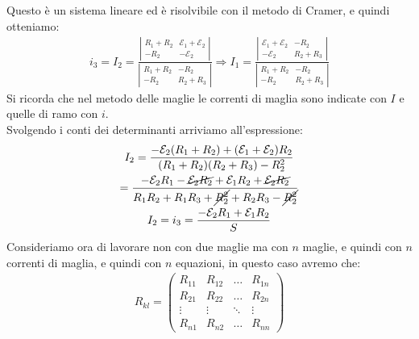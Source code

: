 \documentclass[a4paper, oneside]{article}
\begin{document}
Questo è un sistema lineare ed è risolvibile con il metodo di Cramer, e quindi otteniamo:
\begin{gather*}
    i_3 = I_2 = \frac{\left\lvert \begin{matrix}
        R_1 + R_2 & \mathcal{E}_1 + \mathcal{E}_2\\
        -R_2 & -\mathcal{E}_2
    \end{matrix} \right\rvert }{\left\lvert \begin{matrix}
        R_1 + R_2 & -R_2\\
        -R_2 & R_2 + R_3
    \end{matrix} \right\rvert }
    \Rightarrow I_1 = \frac{\left\lvert \begin{matrix}
        \mathcal{E}_1 + \mathcal{E}_2 & -R_2\\
        -\mathcal{E}_2 & R_2 + R_3
    \end{matrix} \right\rvert }{\left\lvert \begin{matrix}
        R_1 + R_2 & -R_2\\
        -R_2 & R_2 + R_3
    \end{matrix} \right\rvert }
\end{gather*}
Si ricorda che nel metodo delle maglie le correnti di maglia sono indicate con $I$ e quelle di ramo con $i$.\\ 
Svolgendo i conti dei determinanti arriviamo all'espressione:
\begin{gather*}
    I_2 = \frac{-\mathcal{E}_2(R_1 + R_2) + (\mathcal{E}_1 + \mathcal{E}_2)R_2}{(R_1 + R_2)(R_2 + R_3) - R_2^2}\\
    = \frac{-\mathcal{E}_2 R_1 - \cancel{\mathcal{E}_2 R_2} + \mathcal{E}_1 R_2 + \cancel{\mathcal{E}_2 R_2}}{R_1 R_2 + R_1 R_3 + \cancel{R_2^2} + R_2 R_3 - \cancel{R_2^2}}\\
    I_2 = i_3 = \frac{-\mathcal{E}_2 R_1 + \mathcal{E}_1 R_2}{S}
\end{gather*}
Consideriamo ora di lavorare non con due maglie ma con $n$ maglie, e quindi con $n$ correnti di maglia, e quindi con $n$ equazioni, in questo caso avremo che:
\begin{gather*}
    R_{kl} = \begin{pmatrix}
        R_{11} & R_{12} & \dots & R_{1n}\\
        R_{21} & R_{22} & \dots & R_{2n}\\
        \vdots & \vdots & \ddots & \vdots\\
        R_{n1} & R_{n2} & \dots & R_{nn}
    \end{pmatrix}
\end{gather*}
\end{document}
